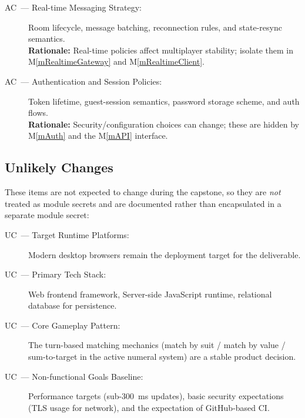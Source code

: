\documentclass[12pt, titlepage]{article}
\newcounter{acnum}
\newcommand{\actheacnum}{AC\theacnum}
\newcounter{ucnum}
\newcommand{\uctheucnum}{UC\theucnum}
\newcommand{\mref}[1]{M\ref{#1}}
\begin{document}
\begin{description}
  \item[\label{acRealtime} \actheacnum\ --- Real-time Messaging Strategy:] 
    Room lifecycle, message batching, reconnection rules, and state-resync semantics.  
    \\
    \textbf{Rationale:} Real-time policies affect multiplayer stability; isolate them in \mref{mRealtimeGateway} and \mref{mRealtimeClient}.

  \item[\label{acAuth} \actheacnum\ --- Authentication and Session Policies:] 
    Token lifetime, guest-session semantics, password storage scheme, and auth flows.  
    \\
    \textbf{Rationale:} Security/configuration choices can change; these are hidden by \mref{mAuth} and the \mref{mAPI} interface.
\end{description}

\subsection{Unlikely Changes}
These items are not expected to change during the capstone, so they are \emph{not} treated as module secrets and are documented rather than encapsulated in a separate module secret:

\begin{description}
  \item[\label{ucPlatform} \uctheucnum\ --- Target Runtime Platforms:]
    Modern desktop browsers remain the deployment target for the deliverable.

  \item[\label{ucTechStack} \uctheucnum\ --- Primary Tech Stack:]
    Web frontend framework, Server-side JavaScript runtime, relational database for persistence.

  \item[\label{ucGameplay} \uctheucnum\ --- Core Gameplay Pattern:]
    The turn-based matching mechanics (match by suit / match by value / sum-to-target in the active numeral system) are a stable product decision.

  \item[\label{ucNFR} \uctheucnum\ --- Non-functional Goals Baseline:]
    Performance targets (sub-300~ms updates), basic security expectations (TLS usage for network), and the expectation of GitHub-based CI.
\end{description}
\end{document}
